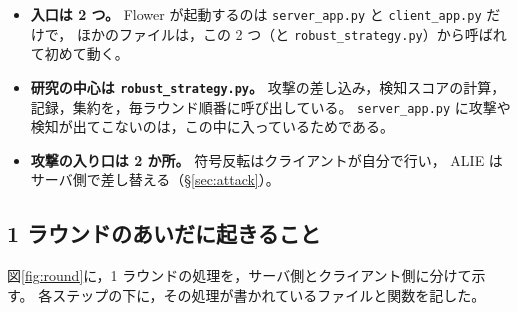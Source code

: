 \documentclass[a4j, dvipdfmx]{jsarticle}  %
\begin{document}
\begin{itemize}
  \item \textbf{入口は 2 つ。} Flower が起動するのは \texttt{server\_app.py} と \texttt{client\_app.py} だけで，
        ほかのファイルは，この 2 つ（と \texttt{robust\_strategy.py}）から呼ばれて初めて動く。
  \item \textbf{研究の中心は \texttt{robust\_strategy.py}。}
        攻撃の差し込み，検知スコアの計算，記録，集約を，毎ラウンド順番に呼び出している。
        \texttt{server\_app.py} に攻撃や検知が出てこないのは，この中に入っているためである。
  \item \textbf{攻撃の入り口は 2 か所。} 符号反転はクライアントが自分で行い，
        ALIE はサーバ側で差し替える（\S\ref{sec:attack}）。
\end{itemize}

\subsection{1 ラウンドのあいだに起きること}

図\ref{fig:round}に，1 ラウンドの処理を，サーバ側とクライアント側に分けて示す。
各ステップの下に，その処理が書かれているファイルと関数を記した。
\end{document}
